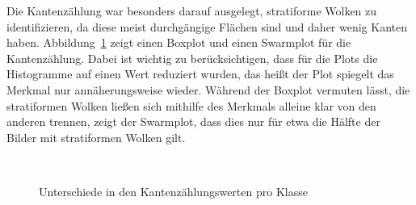 \documentclass[a4,german]{article}
\begin{document}
Die Kantenzählung war besonders darauf ausgelegt, stratiforme Wolken %
zu identifizieren, da diese meist durchgängige Flächen sind und daher wenig Kanten haben.
Abbildung~\ref{fig:kbs} zeigt einen Boxplot und einen Swarmplot für die Kantenzählung.
Dabei ist wichtig zu berücksichtigen, dass für die Plots die Histogramme auf einen Wert reduziert wurden, das heißt der Plot spiegelt das Merkmal nur annäherungsweise wieder.
Während der Boxplot vermuten lässt, die stratiformen Wolken ließen sich mithilfe des Merkmals alleine klar von den anderen trennen, zeigt der Swarmplot, dass dies nur für etwa die Hälfte der Bilder mit stratiformen Wolken gilt. %

\begin{figure}[h!]
\centering
{} \\
\caption{Unterschiede in den Kantenzählungswerten pro Klasse}
    \label{fig:kbs}
\end{figure}
\end{document}
